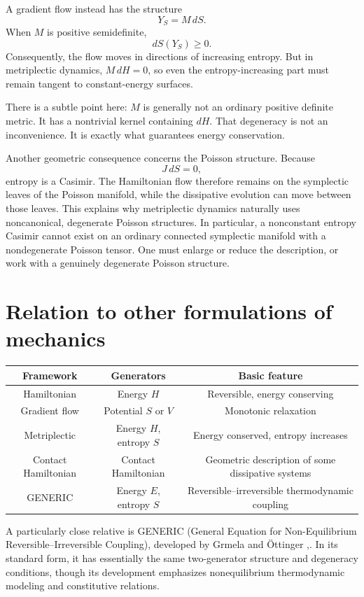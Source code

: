 A gradient flow instead has the structure
\[
Y_S=M\,dS.
\]
When \(M\) is positive semidefinite,
\[
dS(Y_S)\geq0.
\]
Consequently, the flow moves in directions of increasing entropy.
But in metriplectic dynamics, \(M\,dH=0\), so even the entropy-increasing part
must remain tangent to constant-energy surfaces.

There is a subtle point here: \(M\) is generally not an ordinary positive
definite metric. It has a nontrivial kernel containing \(dH\).
That degeneracy is not an inconvenience. It is exactly what guarantees energy
conservation.

Another geometric consequence concerns the Poisson structure. Because
\[
J\,dS=0,
\]
entropy is a Casimir. The Hamiltonian flow therefore remains on the symplectic
leaves of the Poisson manifold, while the dissipative evolution can move
between those leaves.
This explains why metriplectic dynamics naturally uses noncanonical, degenerate Poisson structures.
In particular, a nonconstant entropy Casimir cannot exist on an ordinary
connected symplectic manifold with a nondegenerate Poisson tensor. One must
enlarge or reduce the description, or work with a genuinely degenerate Poisson
structure.

\section{Relation to other formulations of mechanics}
\begin{tabular}{|c|c|c|}
 \hline
    Framework&	Generators&	Basic feature\\ \hline
    Hamiltonian	&Energy \(H\)	&Reversible, energy conserving\\ \hline
    Gradient flow&	Potential \(S\) or \(V\)&	Monotonic relaxation\\\hline
    Metriplectic&	Energy \(H\), entropy \(S\)&	Energy conserved, entropy increases\\\hline
    Contact Hamiltonian&	Contact Hamiltonian&	Geometric description of some dissipative systems\\\hline
    GENERIC&	Energy \(E\), entropy \(S\)	&Reversible–irreversible thermodynamic coupling\\\hline
\end{tabular}

A particularly close relative is GENERIC (General Equation for Non-Equilibrium
Reversible–Irreversible Coupling), developed by Grmela and Öttinger
\cite{GrmelaÖttinger1997},\cite{ÖttingerGrmela1997}. In its
standard form, it has essentially the same two-generator structure and
degeneracy conditions, though its development emphasizes nonequilibrium
thermodynamic modeling and constitutive relations. 

